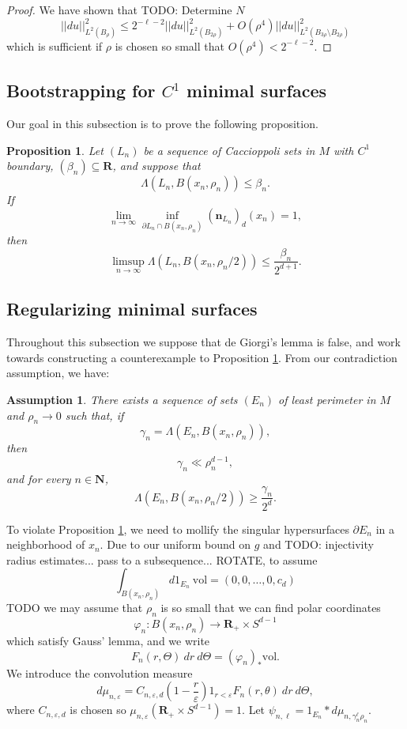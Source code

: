 \documentclass[reqno,12pt,letterpaper]{amsart}
\newcommand{\NN}{\mathbf{N}}
\newcommand{\RR}{\mathbf{R}}
\newcommand{\normal}{\mathbf n}
\newcommand{\vol}{\mathrm{vol}}
\newtheorem{proposition}[theorem]{Proposition}
\newtheorem{assumption}[theorem]{Assumption}
\theoremstyle{definition}
\numberwithin{equation}{section}
\begin{document}
\begin{proof}
We have shown that TODO: Determine $N$
$$||du||_{L^2(B_\rho)}^2 \leq 2^{-\ell-2}||du||_{L^2(B_{2\rho})}^2 + O(\rho^4) ||du||_{L^2(B_{3\rho} \setminus B_{2\rho})}^2$$
which is sufficient if $\rho$ is chosen so small that $O(\rho^4) < 2^{-\ell-2}$.
\end{proof}

\subsection{Bootstrapping for $C^1$ minimal surfaces}
Our goal in this subsection is to prove the following proposition.

\begin{proposition}
\label{bootstrap C1}
Let $(L_n)$ be a sequence of Caccioppoli sets in $M$ with $C^1$ boundary, $(\beta_n) \subseteq \RR$, and suppose that
$$\Lambda(L_n, B(x_n, \rho_n)) \leq \beta_n.$$
If
$$\lim_{n \to \infty} \inf_{\partial L_n \cap B(x_n, \rho_n)} (\normal_{L_n})_d(x_n) = 1,$$
then
$$\limsup_{n \to \infty} \Lambda(L_n, B(x_n, \rho_n/2)) \leq \frac{\beta_n}{2^{d + 1}}.$$
\end{proposition}

\subsection{Regularizing minimal surfaces}
Throughout this subsection we suppose that de Giorgi's lemma is false, and work towards constructing a counterexample to Proposition \ref{bootstrap C1}.
From our contradiction assumption, we have:

\begin{assumption} \label{contradict DGL}
There exists a sequence of sets $(E_n)$ of least perimeter in $M$ and $\rho_n \to 0$ such that, if
$$\gamma_n = \Lambda(E_n, B(x_n, \rho_n)),$$
then
\begin{equation}\label{contradict DGL bootstrap}
\gamma_n \ll \rho_n^{d - 1},
\end{equation}
and for every $n \in \NN$,
\begin{equation}\label{contradict DGL eqn}
\Lambda(E_n, B(x_n, \rho_n/2)) \geq \frac{\gamma_n}{2^d}.
\end{equation}
\end{assumption}

To violate Proposition \ref{bootstrap C1}, we need to mollify the singular hypersurfaces $\partial E_n$ in a neighborhood of $x_n$.
Due to our uniform bound on $g$ and TODO: injectivity radius estimates... pass to a subsequence... ROTATE, to assume
$$\int_{B(x_n, \rho_n)} d1_{E_n}~\vol = (0, 0, \dots, 0, c_d)$$
TODO we may assume that $\rho_n$ is so small that we can find polar coordinates
$$\varphi_n: B(x_n, \rho_n) \to \RR_+ \times S^{d - 1}$$
which satisfy Gauss' lemma, and we write
$$F_n(r, \Theta) ~dr ~d\Theta = (\varphi_n)_* \vol.$$
We introduce the convolution measure
$$d\mu_{n, \varepsilon} = C_{n, \varepsilon, d} \left(1 - \frac{r}{\varepsilon}\right)1_{r < \varepsilon} F_n(r, \theta) ~dr ~d\Theta,$$
where $C_{n, \varepsilon, d}$ is chosen so $\mu_{n, \varepsilon}(\RR_+ \times S^{d - 1}) = 1$.
Let $\psi_{n, \ell} = 1_{E_n} * d\mu_{n, \gamma_n^\ell \rho_n}$.
\end{document}
